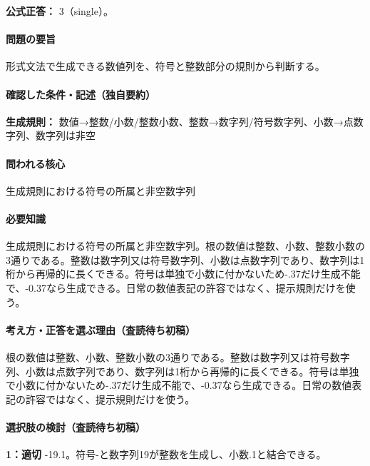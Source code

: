 \textbf{公式正答：} 3（single）。

\paragraph{問題の要旨} 形式文法で生成できる数値列を、符号と整数部分の規則から判断する。

\paragraph{確認した条件・記述（独自要約）}\mbox{}\par

\noindent\textbf{生成規則：} 数値→整数/小数/整数小数、整数→数字列/符号数字列、小数→点数字列、数字列は非空\par

\paragraph{問われる核心} 生成規則における符号の所属と非空数字列

\paragraph{必要知識} 生成規則における符号の所属と非空数字列。根の数値は整数、小数、整数小数の3通りである。整数は数字列又は符号数字列、小数は点数字列であり、数字列は1桁から再帰的に長くできる。符号は単独で小数に付かないため-.37だけ生成不能で、-0.37なら生成できる。日常の数値表記の許容ではなく、提示規則だけを使う。

\paragraph{考え方・正答を選ぶ理由（査読待ち初稿）} 根の数値は整数、小数、整数小数の3通りである。整数は数字列又は符号数字列、小数は点数字列であり、数字列は1桁から再帰的に長くできる。符号は単独で小数に付かないため-.37だけ生成不能で、-0.37なら生成できる。日常の数値表記の許容ではなく、提示規則だけを使う。

\paragraph{選択肢の検討（査読待ち初稿）}\mbox{}\par

\noindent\textbf{1：適切} -19.1。符号-と数字列19が整数を生成し、小数.1と結合できる。\par

